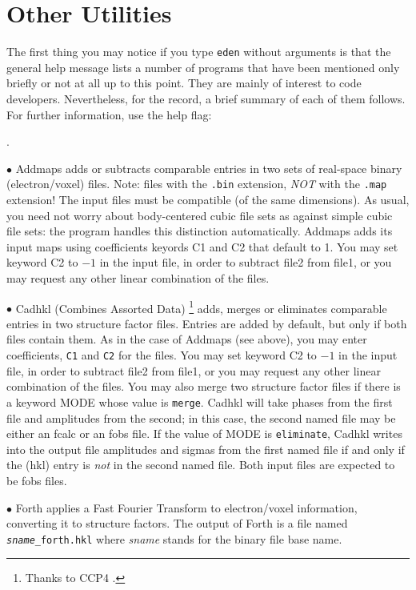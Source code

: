 \documentclass{report}
\begin{document}
{\section {Other Utilities}
\label{advanced-other}

The first thing you may notice if you type {\tt eden} without arguments is
that the general help message lists a number of programs that have been
mentioned only briefly or not at all up to this point.
They are mainly of interest to code developers.  
Nevertheless, for the record, a brief summary of each of them follows.  For
further information, use the help flag:

.

$\bullet$ Addmaps adds or subtracts comparable entries in 
two sets of real-space binary (electron/voxel) files.  Note:  files with the
{\tt .bin} extension, {\em NOT} with the {\tt .map} extension!
The input files must be compatible (of the same 
dimensions).  As usual, you need not worry about body-centered cubic file sets
as against simple cubic file sets: the program handles this distinction 
automatically.  Addmaps adds its input maps using coefficients keyords
C1 and C2
that default to 1.  You may set keyword C2 to $-1$ in the input file, in order
to subtract file2 from file1, or you may request any other linear
combination of the files.

$\bullet$ Cadhkl (Combines Assorted Data) \footnote{Thanks to CCP4 \cite{ccp4}.}
adds, merges or eliminates comparable entries in two structure 
factor files.  Entries are added by default, but
only if both files contain them.  As in the case of Addmaps (see above), 
you may enter coefficients, {\tt C1} and {\tt C2} for the files.  
You may set keyword C2 to $-1$ in the input file, in order
to subtract file2 from file1, or you may request any other linear
combination of the files.
You may also merge two structure factor files
if there is a keyword MODE whose value is {\tt merge}.
Cadhkl will take phases from the 
first file and amplitudes from the second; in this case, the second named file
 may be either an fcalc or an fobs file.  
If the value of MODE is 
{\tt eliminate}, Cadhkl writes into the output file amplitudes and sigmas from the
first named file if and only if the (hkl) entry is {\em not} in the second 
named file. Both input files are expected to be fobs files.

$\bullet$ Forth applies a Fast Fourier Transform to electron/voxel 
information, converting it to structure factors.  The output of Forth is a file
named {\tt {\it sname}\_forth.hkl}
where {\it sname} stands for the binary file base name.

}
\end{document}
